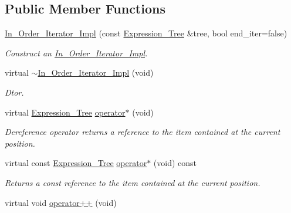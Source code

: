 \subsection*{Public Member Functions}
\begin{DoxyCompactItemize}
\item 
\hyperlink{classMadara_1_1Expression__Tree_1_1In__Order__Iterator__Impl_a4f47250eee067c25f120806b77fbba19}{In\_\-Order\_\-Iterator\_\-Impl} (const \hyperlink{classMadara_1_1Expression__Tree_1_1Expression__Tree}{Expression\_\-Tree} \&tree, bool end\_\-iter=false)
\begin{DoxyCompactList}\small\item\em Construct an \hyperlink{classMadara_1_1Expression__Tree_1_1In__Order__Iterator__Impl}{In\_\-Order\_\-Iterator\_\-Impl}. \item\end{DoxyCompactList}\item 
virtual \hyperlink{classMadara_1_1Expression__Tree_1_1In__Order__Iterator__Impl_a7b083d6c1f4bbbae409dbef0bbcf7fa1}{$\sim$In\_\-Order\_\-Iterator\_\-Impl} (void)
\begin{DoxyCompactList}\small\item\em Dtor. \item\end{DoxyCompactList}\item 
virtual \hyperlink{classMadara_1_1Expression__Tree_1_1Expression__Tree}{Expression\_\-Tree} \hyperlink{classMadara_1_1Expression__Tree_1_1In__Order__Iterator__Impl_a4242478d6afb9c609d1ff6332a09f837}{operator$\ast$} (void)
\begin{DoxyCompactList}\small\item\em Dereference operator returns a reference to the item contained at the current position. \item\end{DoxyCompactList}\item 
virtual const \hyperlink{classMadara_1_1Expression__Tree_1_1Expression__Tree}{Expression\_\-Tree} \hyperlink{classMadara_1_1Expression__Tree_1_1In__Order__Iterator__Impl_abfd4173cf5c1ec04e06aa9b63d94f898}{operator$\ast$} (void) const 
\begin{DoxyCompactList}\small\item\em Returns a const reference to the item contained at the current position. \item\end{DoxyCompactList}\item 
virtual void \hyperlink{classMadara_1_1Expression__Tree_1_1In__Order__Iterator__Impl_a836527fe24ea0b77415fa3f918b74d1e}{operator++} (void)

\end{DoxyCompactItemize}
